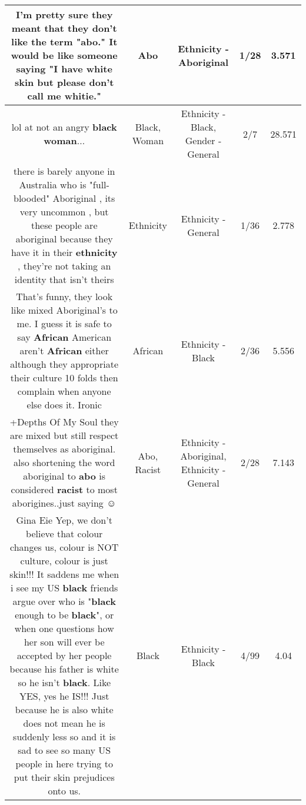 \documentclass[11pt]{article}
\newlength\mylength
\begin{document}
\begin{center}
\begin{longtable}{|C{.65\mylength}|C{.30\mylength}|C{.12\mylength}|C{.12\mylength}|C{.12\mylength}|}
  \small I'm pretty sure they meant that they don't like the term "\textbf{abo}." It would be like someone saying "I have white skin but please don't call me whitie."\normalsize   & Abo & Ethnicity - Aboriginal & 1/28 & 3.571 \\  \hline
  \small lol at not an angry \textbf{black} \textbf{woman}...\normalsize   & Black, Woman & Ethnicity - Black, Gender - General & 2/7 & 28.571 \\  \hline
  \small there is barely anyone in Australia who is "full-blooded" Aboriginal , its very uncommon , but these people are aboriginal because they have it in their \textbf{ethnicity} , they're not taking an identity that isn't theirs\normalsize   & Ethnicity & Ethnicity - General & 1/36 & 2.778 \\  \hline
  \small That's funny, they look like mixed Aboriginal's to me. I guess it is safe to say \textbf{African} American aren't \textbf{African} either although they appropriate their culture 10 folds then complain when anyone else does it.  Ironic\normalsize   & African & Ethnicity - Black & 2/36 & 5.556 \\  \hline
  \small +Depths Of My Soul they are mixed but still respect themselves as aboriginal. also shortening the word aboriginal to \textbf{abo} is considered \textbf{racist} to most aborigines..just saying ☺\normalsize   & Abo, Racist & Ethnicity - Aboriginal, Ethnicity - General & 2/28 & 7.143 \\  \hline
  \small Gina Eie Yep, we don't believe that colour changes us, colour is NOT culture, colour is just skin!!! It saddens me when i see my US \textbf{black} friends argue over who is "\textbf{black} enough to be \textbf{black}", or when one questions how her son will ever be accepted by her people because his father is white so he isn't \textbf{black}. Like YES, yes he IS!!! Just because he is also white does not mean he is suddenly less so and it is sad to see so many US people in here trying to put their skin prejudices onto us.\normalsize   & Black & Ethnicity - Black & 4/99 & 4.04 \\  \hline

\end{longtable}
\end{center}
\end{document}
